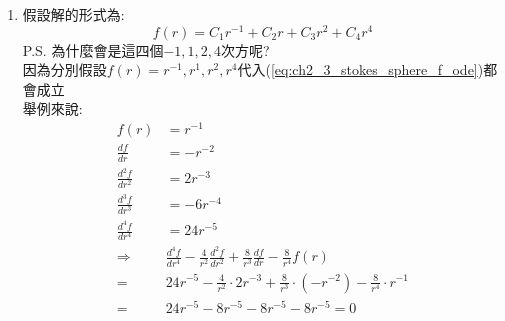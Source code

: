 \documentclass[../main.tex]{subfiles}
\begin{document}
\begin{itemize}
\begin{enumerate}
\begin{align}
      \right] \nonumber\\
      &= \sin^2\theta \cdot \left[
        \frac{d^4 f}{d r^4} - \frac{d}{dr}\left(
          -4r^{-3}f(r) + 2r^{-2}\frac{df}{dr}
        \right) - \frac{2}{r^2}\frac{d^2 f}{d r^2} + \frac{4}{r^4}f(r)
      \right] \nonumber\\
      &= \sin^2\theta \cdot \left[
        \frac{d^4 f}{d r^4} - \left(
          12r^{-4}f(r) - 4r^{-3}\frac{df}{dr} -4r^{-3}\frac{df}{dr} + 2r^{-2}\frac{d^2 f}{d r^2}
        \right) - \frac{2}{r^2}\frac{d^2 f}{d r^2} + \frac{4}{r^4}f(r)
      \right] \nonumber\\
      &= \sin^2\theta \cdot \left[
        \frac{d^4 f}{d r^4} -\frac{4}{r^2}\frac{d^2 f}{d r^2} + \frac{8}{r^3}\frac{df}{dr} - \frac{8}{r^4}f(r)
      \right]  = 0\label{eq:ch2_3_stokes_sphere_E4f}
    \end{align}
    由於$\sin^2\theta \neq 0$，故:
    \begin{equation}
      \boxed{\frac{d^4 f}{d r^4} -\frac{4}{r^2}\frac{d^2 f}{d r^2} + \frac{8}{r^3}\frac{df}{dr} - \frac{8}{r^4}f(r) = 0} \label{eq:ch2_3_stokes_sphere_f_ode}
    \end{equation}
    此式為 Euler equidimensional Equation
    \item  假設解的形式為:
    \begin{equation}
      f(r) = C_1r^{-1} +C_2 r + C_3 r^2 + C_4 r^4
    \end{equation}
    P.S. 為什麼會是這四個$-1,1,2,4$次方呢?\\
    因為分別假設$f(r)=r^{-1},r^1,r^2,r^4$代入(\ref{eq:ch2_3_stokes_sphere_f_ode})都會成立\\
    舉例來說:
    \begin{align}
      f(r) &= r^{-1} \nonumber\\
      \frac{df}{dr} &= -r^{-2} \nonumber\\
      \frac{d^2 f}{d r^2} &= 2r^{-3} \nonumber\\
      \frac{d^3 f}{d r^3} &= -6r^{-4} \nonumber\\
      \frac{d^4 f}{d r^4} &= 24r^{-5} \nonumber\\
      \Rightarrow\quad & \frac{d^4 f}{d r^4} -\frac{4}{r^2}\frac{d^2 f}{d r^2} + \frac{8}{r^3}\frac{df}{dr} - \frac{8}{r^4}f(r) \nonumber\\
      =& 24r^{-5} - \frac{4}{r^2}\cdot 2r^{-3} + \frac{8}{r^3}\cdot (-r^{-2}) - \frac{8}{r^4}\cdot r^{-1} \nonumber\\
      =& 24r^{-5} - 8r^{-5} - 8r^{-5} - 8r^{-5} = 0
    \end{align}

\end{enumerate}
\end{itemize}
\end{document}
